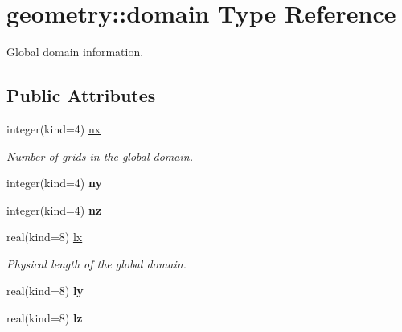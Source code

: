 \hypertarget{structgeometry_1_1domain}{}\section{geometry\+:\+:domain Type Reference}
\label{structgeometry_1_1domain}


Global domain information.  


\subsection*{Public Attributes}
\textbf{ }\par
\begin{DoxyCompactItemize}
\item 
\mbox{\label{structgeometry_1_1domain_a3569446a72ab2191992294f16315edf1}} 
integer(kind=4) \hyperlink{structgeometry_1_1domain_a3569446a72ab2191992294f16315edf1}{nx}
\begin{DoxyCompactList}\small\item\em Number of grids in the global domain. \end{DoxyCompactList}\item 
\mbox{\label{structgeometry_1_1domain_aadb56ae70277efeb96d8552e7d19b694}} 
integer(kind=4) {\bfseries ny}
\item 
\mbox{\label{structgeometry_1_1domain_aa92f4b4c069ce0a2544e2222ca0b0594}} 
integer(kind=4) {\bfseries nz}
\end{DoxyCompactItemize}

\textbf{ }\par
\begin{DoxyCompactItemize}
\item 
\mbox{\label{structgeometry_1_1domain_a8897d7f377fd3fd5853405e5c9692d12}} 
real(kind=8) \hyperlink{structgeometry_1_1domain_a8897d7f377fd3fd5853405e5c9692d12}{lx}
\begin{DoxyCompactList}\small\item\em Physical length of the global domain. \end{DoxyCompactList}\item 
\mbox{\label{structgeometry_1_1domain_a7c1f54c66cde6b0ec541b2f7846229a8}} 
real(kind=8) {\bfseries ly}
\item 
\mbox{\label{structgeometry_1_1domain_aebbb0cfc027eec3f9eaafed12dfd9fdb}} 
real(kind=8) {\bfseries lz}
\end{DoxyCompactItemize}

